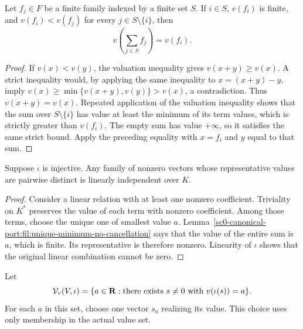 \begin{lemma}
\label{sc0-canonical-port:fil:unique-minimum-no-cancellation}
\leanok
Let \(f_j\in F\) be a finite family indexed by a finite set \(S\).
If \(i\in S\), \(v(f_i)\) is finite, and
\(v(f_i)<v(f_j)\) for every \(j\in S\setminus\{i\}\), then
\[
 v\left(\sum_{j\in S}f_j\right)=v(f_i).
\]
\end{lemma}
\begin{proof}
If \(v(x)<v(y)\), the valuation inequality gives
\(v(x+y)\geq v(x)\). A strict inequality would, by applying the
same inequality to \(x=(x+y)-y\), imply
\(v(x)\geq\min\{v(x+y),v(y)\}>v(x)\), a contradiction.
Thus \(v(x+y)=v(x)\). Repeated application of the valuation
inequality shows that the sum over \(S\setminus\{i\}\) has value
at least the minimum of its term values, which is strictly greater
than \(v(f_i)\). The empty sum has value \(+\infty\), so it
satisfies the same strict bound. Apply the preceding equality with
\(x=f_i\) and \(y\) equal to that sum.
\end{proof}

\begin{lemma}
\label{sc0-canonical-port:fil:distinct-values-independent}
\leanok
Suppose \(\iota\) is injective. Any family of nonzero vectors
whose representative values are pairwise distinct is linearly
independent over \(K\).
\end{lemma}
\begin{proof}
Consider a linear relation with at least one nonzero coefficient.
Triviality on \(K^*\) preserves the value of each term with nonzero
coefficient. Among those terms, choose the unique one of smallest
value \(a\). Lemma~\ref{sc0-canonical-port:fil:unique-minimum-no-cancellation} says
that the value of the entire sum is \(a\), which is finite. Its
representative is therefore nonzero. Linearity of \(\iota\) shows
that the original linear combination cannot be zero.
\end{proof}

\begin{definition}
\label{sc0-canonical-port:fil:valuation-value-set}
\leanok
Let
\[
 \mathcal V_v(V,\iota)
 =\{a\in\mathbf{R}:\text{there exists }s\ne0\text{ with }v(\iota(s))=a\}.
\]
For each \(a\) in this set, choose one vector \(s_a\) realizing
its value. This choice uses only membership in the actual value set.
\end{definition}

